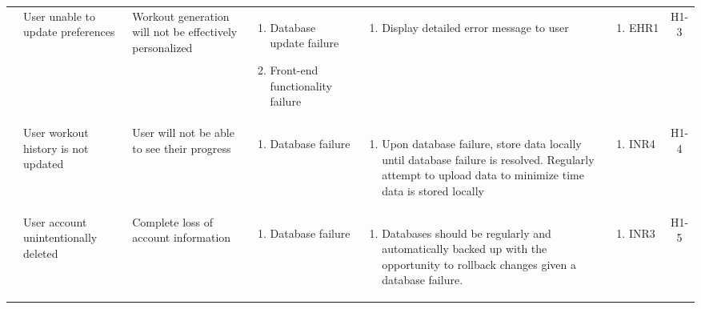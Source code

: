 \documentclass{article}
\begin{document}
\begin{longtable}{|p{1.7cm}|p{1.7cm} p{2.4cm} p{2.4cm} p{3.5cm} p{1.6cm} c|}
        \cline{2-7}
        & User unable to update preferences & Workout generation will not be effectively personalized & \vspace*{-\baselineskip}\begin{enumerate}[label=\alph*., left=0pt, nosep]\item Database update failure \item Front-end functionality failure \end{enumerate} & \vspace*{-\baselineskip}\begin{enumerate}[label=\alph*., left=0pt, nosep]\item Display detailed error message to user \end{enumerate} & \vspace*{-\baselineskip}\begin{enumerate}[label=\alph*., left=0pt, nosep] \item EHR1 \end{enumerate} & H1-3\\
        \cline{2-7}
        & User workout history is not updated & User will not be able to see their progress & \vspace*{-\baselineskip}\begin{enumerate}[label=\alph*., left=0pt, nosep]\item Database failure \end{enumerate} & \vspace*{-\baselineskip}\begin{enumerate}[label=\alph*., left=0pt, nosep]\item Upon database failure, store data locally until database failure is resolved. Regularly attempt to upload data to minimize time data is stored locally \end{enumerate} & \vspace*{-\baselineskip}\begin{enumerate}[label=\alph*., left=0pt, nosep] \item INR4 \end{enumerate} & H1-4\\
        \cline{2-7}
        & User account unintentionally deleted & Complete loss of account information & \vspace*{-\baselineskip}\begin{enumerate}[label=\alph*., left=0pt, nosep]\item Database failure \end{enumerate} & \vspace*{-\baselineskip}\begin{enumerate}[label=\alph*., left=0pt, nosep]\item Databases should be regularly and automatically backed up with the opportunity to rollback changes given a database failure. \end{enumerate}& \vspace*{-\baselineskip}\begin{enumerate}[label=\alph*., left=0pt, nosep] \item INR3 \end{enumerate} & H1-5\\

\end{longtable}
\end{document}
